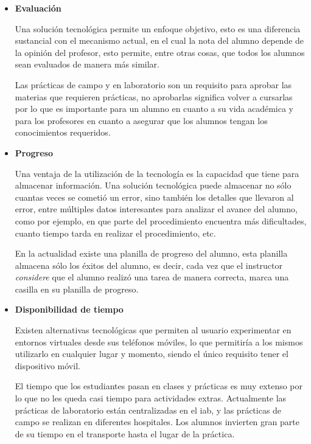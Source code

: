 \begin{itemize}

\item \textbf{Evaluación}

	Una solución tecnológica permite un enfoque objetivo, esto es una diferencia
    sustancial con el mecanismo actual, en el cual la nota del alumno depende de
    la opinión del profesor, esto permite, entre otras cosas, que todos los
    alumnos sean evaluados de manera más similar.
    
    Las prácticas de campo y en laboratorio son un requisito para aprobar las
    materias que requieren prácticas, no aprobarlas significa volver a cursarlas
    por lo que es importante para un alumno en cuanto a su vida académica y para
    los profesores en cuanto a asegurar que los alumnos tengan los conocimientos
    requeridos.
    
    
\item \textbf{Progreso}

	Una ventaja de la utilización de la tecnología es la
    capacidad que tiene para almacenar información. Una solución tecnológica puede
     almacenar no sólo
    cuantas veces se cometió un error, sino también los detalles que llevaron al
    error, entre múltiples datos interesantes para analizar el avance del alumno,
    como por ejemplo, en que parte del procedimiento encuentra más dificultades,
    cuanto tiempo tarda en realizar el procedimiento, etc.

    En la actualidad existe una planilla de progreso del alumno, esta planilla almacena
    sólo los éxitos del alumno, es decir, cada vez que el instructor
    \emph{considere} que el alumno realizó una tarea de manera correcta, marca
    una casilla en su planilla de progreso.

   
    
\item \textbf{Disponibilidad de tiempo}

	Existen alternativas tecnológicas que permiten al usuario experimentar en 
	entornos virtuales desde sus teléfonos móviles, lo que permitiría a los mismos 
	utilizarlo en cualquier lugar y momento, siendo el único requisito tener el 
	dispositivo móvil.
	
    El tiempo que los estudiantes pasan en clases y prácticas es muy extenso por
    lo que no les queda casi tiempo para actividades extras. Actualmente las prácticas 
    de laboratorio están centralizadas en el \Gls{iab}, y las prácticas de campo se 
    realizan en diferentes hospitales. Los alumnos invierten gran parte de su tiempo 
    en el transporte hasta el lugar de la práctica.
    

\end{itemize}

